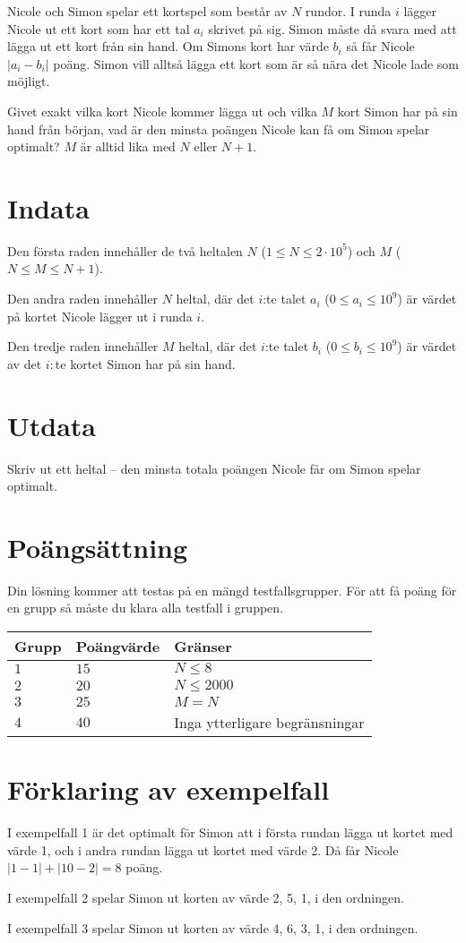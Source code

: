 Nicole och Simon spelar ett kortspel som består av $N$ rundor. I runda $i$ lägger Nicole ut ett kort som har ett tal $a_i$ skrivet på sig. Simon måste då svara med att lägga ut ett kort från sin hand. Om Simons kort har värde $b_i$ så får Nicole $|a_i-b_i|$ poäng. Simon vill alltså lägga ett kort som är så nära det Nicole lade som möjligt.

Givet exakt vilka kort Nicole kommer lägga ut och vilka $M$ kort Simon har på sin hand från början, vad är den minsta poängen Nicole kan få om Simon spelar optimalt? $M$ är alltid lika med $N$ eller $N+1$.

\section*{Indata}
Den första raden innehåller de två heltalen $N$ ($1\leq N \leq 2 \cdot 10^5$) och $M$ ($N\leq M \leq N+1$).

Den andra raden innehåller $N$ heltal, där det $i$:te talet $a_i$ ($0\le a_i \le 10^9$) är värdet på kortet Nicole lägger ut i runda $i$.

Den tredje raden innehåller $M$ heltal, där det $i$:te talet $b_i$ ($0\le b_i \le 10^9$) är värdet av det $i:$te kortet Simon har på sin hand.

\section*{Utdata}
Skriv ut ett heltal -- den minsta totala poängen Nicole får om Simon spelar optimalt.

\section*{Poängsättning}
Din lösning kommer att testas på en mängd testfallsgrupper.
För att få poäng för en grupp så måste du klara alla testfall i gruppen.

\noindent
\begin{tabular}{| l | l | p{12cm} |}
  \hline
  Grupp & Poängvärde & Gränser \\ \hline
  $1$   & $15$       & $N \leq 8 $\\ \hline
  $2$   & $20$       & $N \leq 2000 $  \\ \hline
  $3$   & $25$       & $M=N$ \\ \hline
  $4$   & $40$       & Inga ytterligare begränsningar \\ \hline
\end{tabular}

\section*{Förklaring av exempelfall}
I exempelfall 1 är det optimalt för Simon att i första rundan lägga ut kortet med värde 1, och i andra rundan lägga ut kortet med värde 2. Då får Nicole $|1-1| + |10-2|=8$ poäng.

I exempelfall 2 spelar Simon ut korten av värde 2, 5, 1, i den ordningen.

I exempelfall 3 spelar Simon ut korten av värde 4, 6, 3, 1, i den ordningen.
